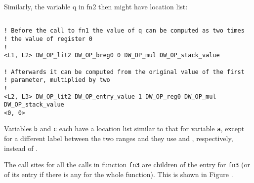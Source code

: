 Similarly, the variable q in fn2 then might have location list:
\begin{lstlisting}

! Before the call to fn1 the value of q can be computed as two times
! the value of register 0
!
<L1, L2> DW_OP_lit2 DW_OP_breg0 0 DW_OP_mul DW_OP_stack_value

! Afterwards it can be computed from the original value of the first
! parameter, multiplied by two
!
<L2, L3> DW_OP_lit2 DW_OP_entry_value 1 DW_OP_reg0 DW_OP_mul DW_OP_stack_value
<0, 0>

\end{lstlisting}

Variables \texttt{b} and \texttt{c} each have a location list similar to 
that for variable \texttt{a},
except for a different label between the two ranges and they
use \DWOPregone{} and \DWOPregtwo{}, respectively, instead of \DWOPregzero.


The call sites for all the calls in function \texttt{fn3} are children of the
\DWTAGsubprogram{} entry for \texttt{fn3} (or of its \DWTAGlexicalblock{} entry
if there is any for the whole function). 
This is shown in Figure .

